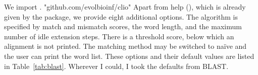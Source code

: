 We import .
\nwenddocs{}\endmoddef\nwstartdeflinemarkup{}\nwenddeflinemarkup
"github.com/evolbioinf/clio"
\nwendcode{}\nwdocspar
Apart from help (), which is already given by the 
package, we provide eight additional options. The algorithm is
specified by match and mismatch scores, the word length, and the
maximum number of idle extension steps. There is a threshold score,
below which an alignment is not printed. The matching method may be
switched to na\"ive and the user can print the word list. These
options and their default values are listed in
Table~\ref{tab:blast}. Wherever I could, I took the defaults from
BLAST.

